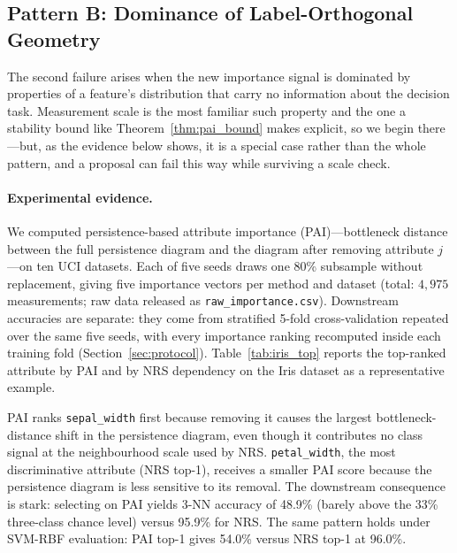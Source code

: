 \subsection{Pattern B: Dominance of Label-Orthogonal Geometry}
\label{sec:patB}

The second failure arises when the new importance signal is dominated by
properties of a feature's distribution that carry no information about the
decision task.  Measurement scale is the most familiar such property and the
one a stability bound like Theorem~\ref{thm:pai_bound} makes explicit, so we
begin there---but, as the evidence below shows, it is a special case rather
than the whole pattern, and a proposal can fail this way while surviving a
scale check.

\paragraph{Experimental evidence.}
We computed persistence-based attribute importance (PAI)---bottleneck distance
between the full persistence diagram and the diagram after removing attribute
$j$---on ten UCI datasets.  Each of five seeds draws one 80\% subsample without
replacement, giving five importance vectors per method and dataset
(total: $4{,}975$ measurements; raw data released as
\texttt{raw\_importance.csv}).  Downstream accuracies are separate: they come
from stratified 5-fold cross-validation repeated over the same five seeds,
with every importance ranking recomputed inside each training fold
(Section~\ref{sec:protocol}).
Table~\ref{tab:iris_top} reports the top-ranked attribute by PAI and by NRS
dependency on the Iris dataset as a representative example.



PAI ranks \texttt{sepal\_width} first because removing it causes the largest
bottleneck-distance shift in the persistence diagram, even though it
contributes no class signal at the neighbourhood scale used by NRS.
\texttt{petal\_width}, the most discriminative attribute (NRS top-1),
receives a smaller PAI score because the persistence diagram is less
sensitive to its removal.
The downstream consequence is stark: selecting on PAI yields 3-NN accuracy of
48.9\% (barely above the 33\% three-class chance level) versus 95.9\%
for NRS.  The same pattern holds under SVM-RBF evaluation: PAI top-1 gives
54.0\% versus NRS top-1 at 96.0\%.

